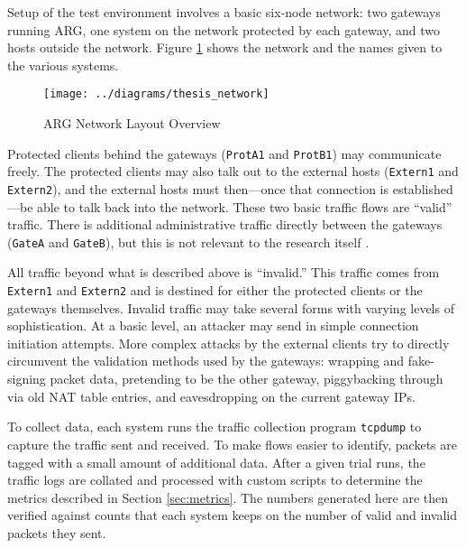 \par Setup of the test environment involves a basic six-node network: two gateways running \ac{ARG}, one system on the network protected by each gateway, and two hosts outside the network. Figure \ref{fig:argnetwork} shows the network and the names given to the various systems.

\begin{figure}
	\centering
	\caption{ARG Network Layout Overview}
	\label{fig:argnetwork}
	\texttt{[image: ../diagrams/thesis\_network]}
\end{figure}

\par Protected clients behind the gateways (\texttt{ProtA1} and \texttt{ProtB1}) may communicate freely. The protected clients may also talk out to the external hosts (\texttt{Extern1} and \texttt{Extern2}), and the external hosts must then---once that connection is established---be able to talk back into the network. These two basic traffic flows are ``valid'' traffic. There is additional administrative traffic directly between the gateways (\texttt{GateA} and \texttt{GateB}), but this is not relevant to the research itself .

\par All traffic beyond what is described above is ``invalid.'' This traffic comes from \texttt{Extern1} and \texttt{Extern2} and is destined for either the protected clients or the gateways themselves. Invalid traffic may take several forms with varying levels of sophistication. At a basic level, an attacker may send in simple connection initiation attempts. More complex attacks by the external clients try to directly circumvent the validation methods used by the gateways: wrapping and fake-signing packet data, pretending to be the other gateway, piggybacking through via old \ac{NAT} table entries, and eavesdropping on the current gateway \acp{IP}.

\par To collect data, each system runs the traffic collection program \texttt{tcpdump} to capture the traffic sent and received. To make flows easier to identify, packets are tagged with a small amount of additional data. After a given trial runs, the traffic logs are collated and processed with custom scripts to determine the metrics described in Section \ref{sec:metrics}. The numbers generated here are then verified against counts that each system keeps on the number of valid and invalid packets they sent.

